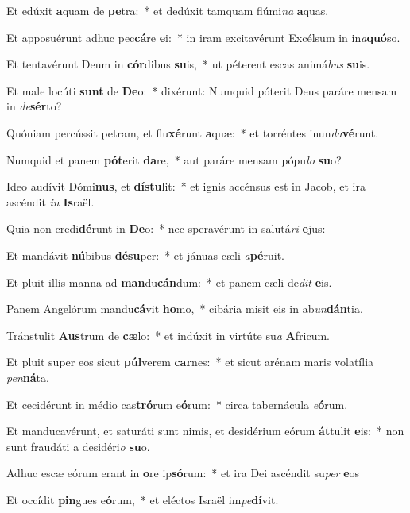 \item Et edúxit \textbf{a}quam de \textbf{pe}tra:~* et dedúxit tamquam flúmi\textit{na} \textbf{a}quas.
\item Et apposuérunt adhuc pec\textbf{cá}re \textbf{e}i:~* in iram excitavérunt Excélsum in in\textit{a}\textbf{quó}so.
\item Et tentavérunt Deum in \textbf{cór}dibus \textbf{su}is,~* ut péterent escas animá\textit{bus} \textbf{su}is.
\item Et male locúti \textbf{sunt} de \textbf{De}o:~* dixérunt: Numquid póterit Deus paráre mensam in \textit{de}\textbf{sér}to?
\item Quóniam percússit petram, et flu\textbf{xé}runt \textbf{a}quæ:~* et torréntes inun\textit{da}\textbf{vé}runt.
\item Numquid et panem \textbf{pót}erit \textbf{da}re,~* aut paráre mensam pópu\textit{lo} \textbf{su}o?
\item Ideo audívit Dómi\textbf{nus}, et \textbf{dís}\textbf{tu}lit:~* et ignis accénsus est in Jacob, et ira ascéndit \textit{in} \textbf{Is}raël.
\item Quia non credi\textbf{dé}runt in \textbf{De}o:~* nec speravérunt in salutá\textit{ri} \textbf{e}jus:
\item Et mandávit \textbf{nú}bibus \textbf{dé}\textbf{su}per:~* et jánuas cæli \textit{a}\textbf{pé}ruit.
\item Et pluit illis manna ad \textbf{man}du\textbf{cán}dum:~* et panem cæli de\textit{dit} \textbf{e}is.
\item Panem Angelórum mandu\textbf{cá}vit \textbf{ho}mo,~* cibária misit eis in ab\textit{un}\textbf{dán}tia.
\item Tránstulit \textbf{Aus}trum de \textbf{cæ}lo:~* et indúxit in virtúte su\textit{a} \textbf{A}fricum.
\item Et pluit super eos sicut \textbf{púl}verem \textbf{car}nes:~* et sicut arénam maris volatília \textit{pen}\textbf{ná}ta.
\item Et cecidérunt in médio cas\textbf{tró}rum e\textbf{ó}rum:~* circa tabernácula \textit{e}\textbf{ó}rum.
\item Et manducavérunt, et saturáti sunt nimis, et desidérium eórum \textbf{át}tulit \textbf{e}is:~* non sunt fraudáti a desidéri\textit{o} \textbf{su}o.
\item Adhuc escæ eórum erant in \textbf{o}re ip\textbf{só}rum:~* et ira Dei ascéndit su\textit{per} \textbf{e}os
\item Et occídit \textbf{pin}gues e\textbf{ó}rum,~* et eléctos Israël im\textit{pe}\textbf{dí}vit.
